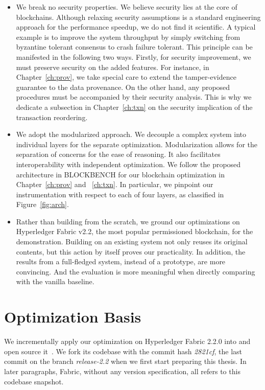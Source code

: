 \begin{itemize}
  \item We break no security properties. We believe security lies at the core of blockchains. Although relaxing security assumptions is a standard engineering approach for the performance speedup, we do not find it scientific. A typical example is to improve the system throughput by simply switching from byzantine tolerant consensus to crash failure tolerant. This principle can be manifested in the following two ways. Firstly, for security improvement, we must preserve security on the added features. For instance, in Chapter~\ref{ch:prov}, we take special care to extend the tamper-evidence guarantee to the data provenance. On the other hand, any proposed procedures must be accompanied by their security analysis. This is why we dedicate a subsection in Chapter~\ref{ch:txn} on the security implication of the transaction reordering. 
  \item We adopt the modularized approach. We decouple a complex system into individual layers for the separate optimization. Modularization allows for the separation of concerns for the ease of reasoning. It also facilitates interoperability with independent optimization. 
  We follow the proposed architecture in BLOCKBENCH for our blockchain optimization in Chapter~\ref{ch:prov} and ~\ref{ch:txn}. In particular, we pinpoint our instrumentation with respect to each of four layers, as classified in Figure~\ref{fig:arch}. 
  \item Rather than building from the scratch, we ground our optimizations on Hyperledger Fabric v2.2, the most popular permissioned blockchain, for the demonstration. Building on an existing system not only reuses its original contents, but this action by itself proves our practicality. In addition, the results from a full-fledged system, instead of a prototype, are more convincing. And the evaluation is more meaningful when directly comparing with the vanilla baseline. 
\end{itemize}

\section{Optimization Basis}
We incrementally apply our optimization on Hyperledger Fabric 2.2.0 into {\fs} and open source it~\cite{fsharp}. We fork its codebase with the commit hash \textit{2821cf}, the last commit on the branch \textit{release-2.2} when we first start preparing this thesis. In later paragraphs, Fabric, without any version specification, all refers to this codebase snapshot. 

